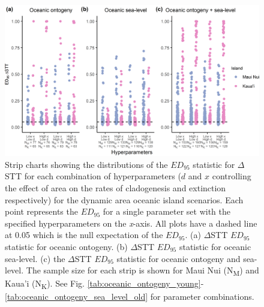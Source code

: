 \documentclass{article}
\begin{document}
\begin{figure}
    \centering
    \includegraphics[width=\textwidth]{Hyperparameters_spec_nltt.png}
    \caption{Strip charts showing the distributions of the $ED_{95}$ statistic for $\Delta$STT for each combination of hyperparameters ($d$ and $x$ controlling the effect of area on the rates of cladogenesis and extinction respectively) for the dynamic area oceanic island scenarios. Each point represents the $ED_{95}$ for a single parameter set with the specified hyperparameters on the \textit{x}-axis. All plots have a dashed line at 0.05 which is the null expectation of the $ED_{95}$. (a) $\Delta$STT $ED_{95}$ statistic for oceanic ontogeny. (b) $\Delta$STT $ED_{95}$ statistic for oceanic sea-level. (c) the $\Delta$STT $ED_{95}$ statistic for oceanic ontogeny and sea-level. The sample size for each strip is shown for Maui Nui (N\textsubscript{M}) and Kaua'i (N\textsubscript{K}). See Fig. \ref{tab:oceanic_ontogeny_young}-\ref{tab:oceanic_ontogeny_sea_level_old} for parameter combinations.}
    \label{fig:Hyperparameters_spec_nltt}
\end{figure}

\clearpage
\end{document}
